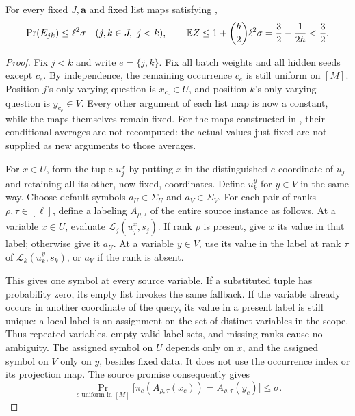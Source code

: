 \begin{lemma}
\label{dec:pair}
For every fixed \(J,\mathbf a\) and fixed list maps satisfying
,
\begin{equation}
 \Pr(E_{jk})\leq\ell^2\sigma
 \quad(j,k\in J,\ j<k),
 \qquad
 \mathbb E Z\leq1+\binom h2\ell^2\sigma
       =\frac32-\frac1{2h}<\frac32.
 \label{dec:pair_bound}
\end{equation}
\end{lemma}
\begin{proof}
Fix \(j<k\) and write \(e=\{j,k\}\). Fix all batch weights
and all hidden seeds except \(c_e\). By independence, the
remaining occurrence \(c_e\) is still uniform on \([M]\).
Position \(j\)'s only varying question is \(x_{c_e}\in U\),
and position \(k\)'s only varying question is \(y_{c_e}\in V\).
Every other argument of each list map is now a constant, while the
maps themselves remain fixed. For the maps constructed in
, their conditional averages are not recomputed:
the actual values just fixed are not supplied as new arguments to
those averages.

For \(x\in U\), form the tuple \(u_j^{x}\) by putting \(x\)
in the distinguished \(e\)-coordinate of \(u_j\) and retaining
all its other, now fixed, coordinates. Define \(u_k^{y}\) for
\(y\in V\) in the same way. Choose default symbols
\(a_U\in\Sigma_U\) and \(a_V\in\Sigma_V\). For each pair
of ranks \(\rho,\tau\in[\ell]\), define a labeling
\(A_{\rho,\tau}\) of the entire source instance as follows.
At a variable \(x\in U\), evaluate
\(\mathcal L_j(u_j^{x},s_j)\). If rank \(\rho\) is present,
give \(x\) its value in that label; otherwise give it \(a_U\).
At a variable \(y\in V\), use its value in the label at rank
\(\tau\) of \(\mathcal L_k(u_k^{y},s_k)\), or \(a_V\) if
the rank is absent.

This gives one symbol at every source variable. If a substituted
tuple has probability zero, its empty list invokes the same
fallback. If the variable already occurs in another coordinate of
the query, its value in a present label is still unique: a local
label is an assignment on the set of distinct variables in the
scope. Thus repeated variables, empty valid-label sets, and missing
ranks cause no ambiguity. The assigned symbol on \(U\) depends
only on \(x\), and the assigned symbol on \(V\) only on \(y\),
besides fixed data. It does not use the occurrence index or its
projection map. The source promise consequently gives
\begin{equation}
 \Pr_{c\text{ uniform in }[M]}
 \bigl[\pi_c(A_{\rho,\tau}(x_c))
                    =A_{\rho,\tau}(y_c)\bigr]\leq\sigma.
 \label{dec:rank_soundness}
\end{equation}


\end{proof}
